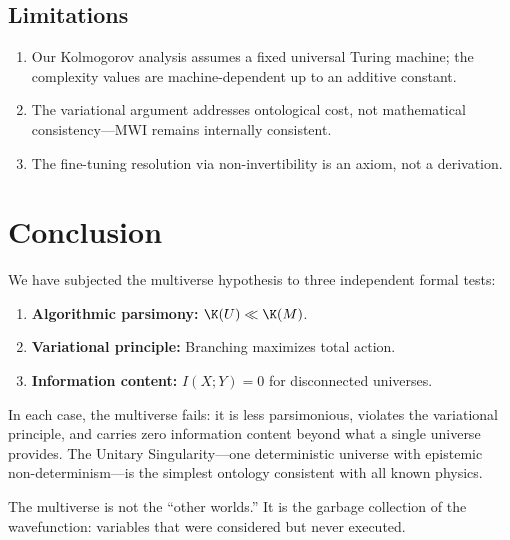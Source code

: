 \documentclass[12pt, a4paper]{article}
\theoremstyle{plain}
\theoremstyle{definition}
\begin{document}
\subsection{Limitations}

\begin{enumerate}
  \item Our Kolmogorov analysis assumes a fixed universal Turing machine;
    the complexity values are machine-dependent up to an additive constant.
  \item The variational argument addresses ontological cost, not
    mathematical consistency---MWI remains internally consistent.
  \item The fine-tuning resolution via non-invertibility is an axiom,
    not a derivation.
\end{enumerate}

\section{Conclusion}\label{sec:conclusion}

We have subjected the multiverse hypothesis to three independent formal
tests:

\begin{enumerate}
  \item \textbf{Algorithmic parsimony:} $\K(U) \ll \K(M)$.
  \item \textbf{Variational principle:} Branching maximizes total action.
  \item \textbf{Information content:} $I(X; Y) = 0$ for disconnected
    universes.
\end{enumerate}

In each case, the multiverse fails: it is less parsimonious, violates the
variational principle, and carries zero information content beyond what a
single universe provides. The Unitary Singularity---one deterministic
universe with epistemic non-determinism---is the simplest ontology
consistent with all known physics.

The multiverse is not the ``other worlds.'' It is the garbage collection
of the wavefunction: variables that were considered but never executed.

\end{document}
